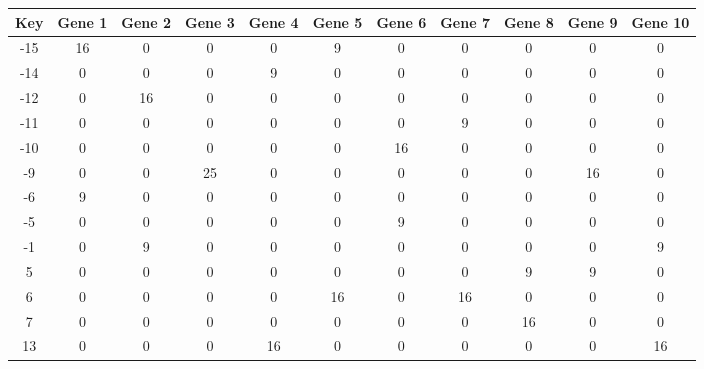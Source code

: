 \begin{tabular}{|c|c|c|c|c|c|c|c|c|c|c|}
\hline
Key & Gene 1 & Gene 2 & Gene 3 & Gene 4 & Gene 5 & Gene 6 & Gene 7 & Gene 8 & Gene 9 & Gene 10 \\
\hline
-15 & 16 & 0 & 0 & 0 & 9 & 0 & 0 & 0 & 0 & 0 \\
-14 & 0 & 0 & 0 & 9 & 0 & 0 & 0 & 0 & 0 & 0 \\
-12 & 0 & 16 & 0 & 0 & 0 & 0 & 0 & 0 & 0 & 0 \\
-11 & 0 & 0 & 0 & 0 & 0 & 0 & 9 & 0 & 0 & 0 \\
-10 & 0 & 0 & 0 & 0 & 0 & 16 & 0 & 0 & 0 & 0 \\
-9 & 0 & 0 & 25 & 0 & 0 & 0 & 0 & 0 & 16 & 0 \\
-6 & 9 & 0 & 0 & 0 & 0 & 0 & 0 & 0 & 0 & 0 \\
-5 & 0 & 0 & 0 & 0 & 0 & 9 & 0 & 0 & 0 & 0 \\
-1 & 0 & 9 & 0 & 0 & 0 & 0 & 0 & 0 & 0 & 9 \\
5 & 0 & 0 & 0 & 0 & 0 & 0 & 0 & 9 & 9 & 0 \\
6 & 0 & 0 & 0 & 0 & 16 & 0 & 16 & 0 & 0 & 0 \\
7 & 0 & 0 & 0 & 0 & 0 & 0 & 0 & 16 & 0 & 0 \\
13 & 0 & 0 & 0 & 16 & 0 & 0 & 0 & 0 & 0 & 16 \\
\hline
\end{tabular}